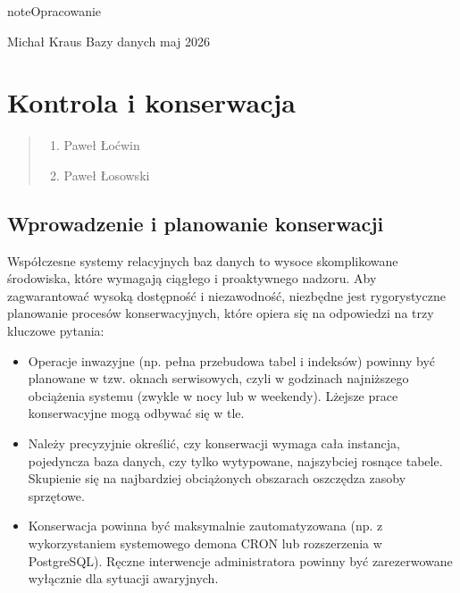 \documentclass[a4paper,11pt,english,openany,oneside]{sphinxmanual}
\begin{document}
\begin{sphinxadmonition}{note}{Opracowanie}

\sphinxAtStartPar
{} Michał Kraus
 Bazy danych
 maj 2026
\end{sphinxadmonition}

\sphinxstepscope


\section{Kontrola i konserwacja}
\label{\detokenize{rozdzial_2/rozdzial_23/index:kontrola-i-konserwacja}}\label{\detokenize{rozdzial_2/rozdzial_23/index::doc}}\begin{quote}\begin{description}
\begin{enumerate}
%
\item {} 
\sphinxAtStartPar
Paweł Łoćwin

\item {} 
\sphinxAtStartPar
Paweł Łosowski

\end{enumerate}

\end{description}\end{quote}


\subsection{Wprowadzenie i planowanie konserwacji}
\label{\detokenize{rozdzial_2/rozdzial_23/index:wprowadzenie-i-planowanie-konserwacji}}
\sphinxAtStartPar
Współczesne systemy relacyjnych baz danych to wysoce skomplikowane środowiska, które wymagają ciągłego i proaktywnego nadzoru. Aby zagwarantować wysoką dostępność i niezawodność, niezbędne jest rygorystyczne planowanie procesów konserwacyjnych, które opiera się na odpowiedzi na trzy kluczowe pytania:
\begin{itemize}
\item {} 
\sphinxAtStartPar
{} Operacje inwazyjne (np. pełna przebudowa tabel i indeksów) powinny być planowane w tzw. oknach serwisowych, czyli w godzinach najniższego obciążenia systemu (zwykle w nocy lub w weekendy). Lżejsze prace konserwacyjne mogą odbywać się w tle.

\item {} 
\sphinxAtStartPar
{} Należy precyzyjnie określić, czy konserwacji wymaga cała instancja, pojedyncza baza danych, czy tylko wytypowane, najszybciej rosnące tabele. Skupienie się na najbardziej obciążonych obszarach oszczędza zasoby sprzętowe.

\item {} 
\sphinxAtStartPar
{} Konserwacja powinna być maksymalnie zautomatyzowana (np. z wykorzystaniem systemowego demona CRON lub rozszerzenia  w PostgreSQL). Ręczne interwencje administratora powinny być zarezerwowane wyłącznie dla sytuacji awaryjnych.

\end{itemize}
\end{document}

